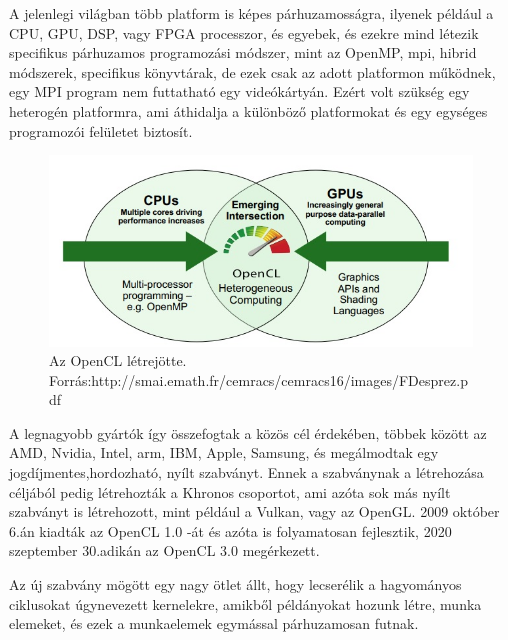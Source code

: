 

A jelenlegi világban több platform is képes párhuzamosságra, ilyenek például a CPU, GPU, DSP, vagy FPGA processzor, és egyebek, és ezekre mind létezik specifikus párhuzamos programozási módszer, mint az OpenMP, mpi, hibrid módszerek, specifikus könyvtárak, de ezek csak az adott platformon működnek, egy MPI program nem futtatható egy videókártyán. Ezért volt szükség egy heterogén platformra, ami áthidalja a különböző platformokat és egy egységes programozói felületet biztosít. 

\begin{figure}[h]
\centering
\includegraphics[scale=0.7]{images/opencl_origin.jpg}
\caption{Az OpenCL létrejötte. \\ Forrás:http://smai.emath.fr/cemracs/cemracs16/images/FDesprez.pdf}
\label{fig:m2sv}
\end{figure}

A legnagyobb gyártók így összefogtak a közös cél érdekében, többek között az AMD, Nvidia, Intel, arm, IBM, Apple, Samsung, és megálmodtak egy jogdíjmentes,hordozható, nyílt szabványt. Ennek a szabványnak a létrehozása céljából pedig létrehozták a Khronos csoportot, ami azóta sok más nyílt szabványt is létrehozott, mint például a Vulkan, vagy az OpenGL. 2009 október 6.án kiadták az OpenCL 1.0 -át és azóta is folyamatosan fejlesztik, 2020 szeptember 30.adikán az OpenCL 3.0 megérkezett.

Az új szabvány mögött egy nagy ötlet állt, hogy lecserélik a hagyományos ciklusokat úgynevezett kernelekre, amikből példányokat hozunk létre, munka elemeket, és ezek a munkaelemek egymással párhuzamosan futnak.

